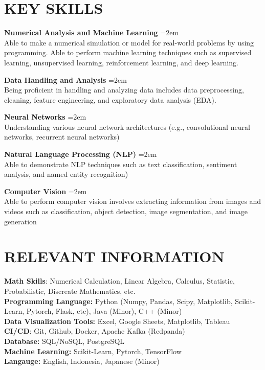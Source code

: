 \documentclass[paper=a4,fontsize=10pt]{scrartcl} %
\newcommand{\sepspace}{\vspace*{1em}}		%
\newcommand{\NewPart}[1]{\section*{\uppercase{#1}}}
\newcommand{\KerjaEntry}[2]{
		\noindent \textbf{#1} \hfill      %
		\noindent\hangindent=2em\hangafter=0 \small #2 %
		\normalsize \par}
\begin{document}
\NewPart{KEY Skills}{}

\KerjaEntry{Numerical Analysis and Machine Learning}{\\Able to make a numerical simulation or model for real-world problems by using programming. Able to perform machine learning techniques such as supervised learning, unsupervised learning, reinforcement learning, and deep learning.
}

\sepspace

\KerjaEntry{Data Handling and Analysis}{\\ Being proficient in handling and analyzing data includes data preprocessing, cleaning, feature engineering, and exploratory data analysis (EDA).
}

\sepspace

\KerjaEntry{Neural Networks}{\\ Understanding various neural network architectures (e.g., convolutional neural networks, recurrent neural networks)

\sepspace

\KerjaEntry{Natural Language Processing (NLP)}{\\ Able to demonstrate NLP techniques such as text classification, sentiment analysis, and named entity recognition)
}

\sepspace

\KerjaEntry{Computer Vision}{\\ Able to perform computer vision involves extracting information from images and videos such as classification, object detection, image segmentation, and image generation
}
}
\NewPart{RELEVANT INFORMATION}{}
\textbf{Math Skills}: Numerical Calculation, Linear Algebra, Calculus, Statistic, Probabilistic, Discreate Mathematics, etc.\\
\textbf{Programming Language:} Python (Numpy, Pandas, Scipy, Matplotlib, Scikit-Learn, Pytorch, Flask, etc), Java (Minor), C++ (Minor)\\
\textbf{Data Visualization Tools:}  Excel, Google Sheets, Matplotlib, Tableau\\
\textbf{CI/CD}: Git, Github, Docker, Apache Kafka (Redpanda) \\
\textbf{Database:} SQL/NoSQL, PostgreSQL \\
\textbf{Machine Learning:} Scikit-Learn, Pytorch, TensorFlow\\
\textbf{Langauge:} English, Indonesia, Japanese (Minor) \\
\end{document}
